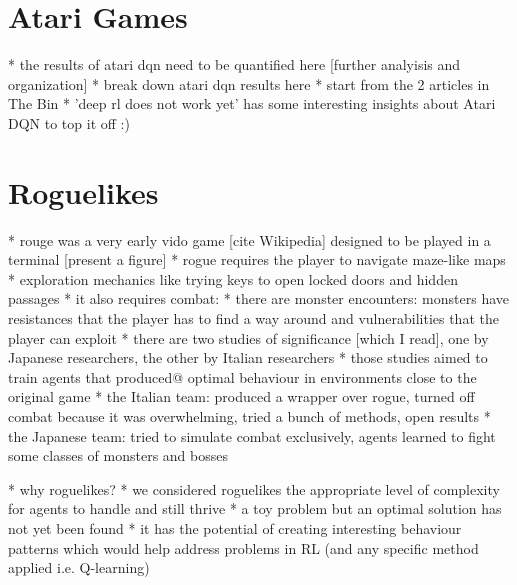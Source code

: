 
\section{Atari Games}

* the results of atari dqn need to be quantified here [further analyisis and organization]
* break down atari dqn results here
* start from the 2 articles in The Bin
* 'deep rl does not work yet' has some interesting insights about Atari DQN to top it off :)

\section{Roguelikes}

* rouge was a very early vido game [cite Wikipedia] designed to be played
in a terminal [present a figure]
* rogue requires the player to navigate maze-like maps
* exploration mechanics like trying keys to open locked doors and hidden passages
* it also requires combat:
* there are monster encounters: monsters have resistances that the player has to find a way around and vulnerabilities that the player can exploit
* there are two studies of significance [which I read], one by Japanese researchers, the other by Italian researchers
* those studies aimed to train agents that produced@ optimal behaviour in environments close to the original game
* the Italian team: produced a wrapper over rogue, turned off combat because it was overwhelming, tried a bunch of methods, open results
* the Japanese team: tried to simulate combat exclusively, agents learned to fight some classes of monsters and bosses

* why roguelikes?
* we considered roguelikes the appropriate level of complexity for agents to handle and still thrive
* a toy problem but an optimal solution has not yet been found
* it has the potential of creating interesting behaviour patterns which would help address problems in RL (and any specific method applied i.e. Q-learning)